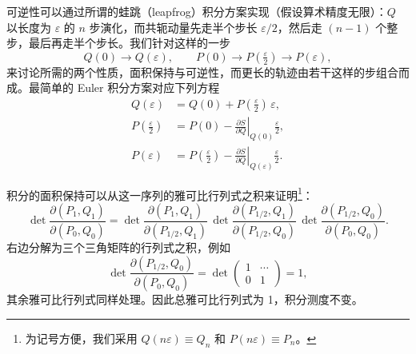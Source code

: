可逆性可以通过所谓的蛙跳（leapfrog）积分方案实现（假设算术精度无限）：$Q$ 以长度为 $\varepsilon$ 的 $n$ 步演化，而共轭动量先走半个步长 $\varepsilon/2$，然后走 $(n-1)$ 个整步，最后再走半个步长。我们针对这样的一步
\begin{equation}
Q(0) \to Q(\varepsilon), \qquad
P(0) \to P(\tfrac{\varepsilon}{2}) \to P(\varepsilon),
\end{equation}
来讨论所需的两个性质，面积保持与可逆性，而更长的轨迹由若干这样的步组合而成。最简单的 Euler 积分方案对应下列方程
\begin{equation}
\begin{split}
Q(\varepsilon) &= Q(0) + P(\tfrac{\varepsilon}{2})\,\varepsilon, \\
P(\tfrac{\varepsilon}{2}) &= P(0) - \left.\frac{\partial S}{\partial Q}\right|_{Q(0)}\frac{\varepsilon}{2}, \\
P(\varepsilon) &= P(\tfrac{\varepsilon}{2}) - \left.\frac{\partial S}{\partial Q}\right|_{Q(\varepsilon)}\frac{\varepsilon}{2}.
\end{split}
\end{equation}

积分的面积保持可以从这一序列的雅可比行列式之积来证明\footnote{为记号方便，我们采用 $Q(n\varepsilon) \equiv Q_n$ 和 $P(n\varepsilon) \equiv P_n$。}：
\begin{equation}
\det\frac{\partial(P_1,Q_1)}{\partial(P_0,Q_0)}
= \det\frac{\partial(P_1,Q_1)}{\partial(P_{1/2},Q_1)}\,
  \det\frac{\partial(P_{1/2},Q_1)}{\partial(P_{1/2},Q_0)}\,
  \det\frac{\partial(P_{1/2},Q_0)}{\partial(P_0,Q_0)}.
\end{equation}
右边分解为三个三角矩阵的行列式之积，例如
\begin{equation}
\det\frac{\partial(P_{1/2},Q_0)}{\partial(P_0,Q_0)}
= \det\begin{pmatrix} 1 & \cdots \\ 0 & 1 \end{pmatrix} = 1,
\end{equation}
其余雅可比行列式同样处理。因此总雅可比行列式为 1，积分测度不变。

